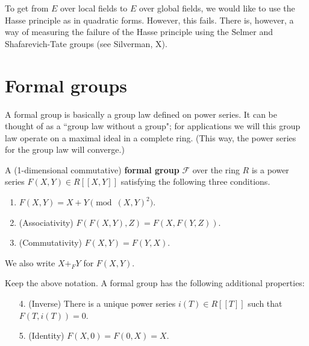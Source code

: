 To get from $E$ over local fields to $E$ over global fields, we would like to use the Hasse principle as in quadratic forms. However, this fails. There is, however, a way of measuring the failure of the Hasse principle using the Selmer and Shafarevich-Tate groups (see Silverman, X).


\section{Formal groups}
A formal group is basically a group law defined on power series. It can be thought of as a ``group law without a group"; for applications we will this group law operate on a maximal ideal in a complete ring. (This way, the power series for the group law will converge.)
\begin{df}
A (1-dimensional commutative) \textbf{formal group} $\mathscr F$ over the ring $R$ is a power series $F(X,Y)\in R[[X,Y]]$ satisfying the following three conditions.
\begin{enumerate}
\item
$F(X,Y)=X+Y\pmod{(X,Y)^2}$. %
\item (Associativity)
$F(F(X,Y),Z)=F(X,F(Y,Z))$.
\item (Commutativity)
$F(X,Y)=F(Y,X)$.
\end{enumerate}
We also write $X+_F Y$ for $F(X,Y)$.
\end{df}
\begin{pr} Keep the above notation.
A formal group has the following additional properties:
\begin{enumerate}
\item[4.] (Inverse) There is a unique power series $i(T)\in R[[T]]$ such that $F(T,i(T))=0$.
\item[5.] (Identity) $F(X,0)=F(0,X)=X$.
\end{enumerate}
\end{pr}
